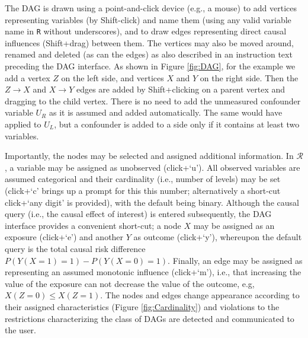 The DAG is drawn using a point-and-click device (e.g., a mouse) to add vertices representing variables (by Shift-click) and name them (using any valid variable name in \texttt{R} without underscores), and to draw edges representing direct causal influences (Shift+drag) between them. The vertices may also be moved around, renamed and deleted (as can the edges) as also described in an instruction text preceding the DAG interface. As shown in Figure \ref{fig:DAG}, for the example we add a vertex \(Z\) on the left side, and vertices \(X\) and \(Y\) on the right side. Then the \(Z \to X\) and \(X \to Y\) edges are added by Shift+clicking on a parent vertex and dragging to the child vertex. There is no need to add the unmeasured confounder variable \(U_R\) as it is assumed and added automatically. The same would have applied to \(U_L\), but a confounder is added to a side only if it contains at least two variables.

Importantly, the nodes may be selected and assigned additional information. In \(\mathcal{R}\), a variable may be assigned as unobserved (click+`u'). All observed variables are assumed categorical and their cardinality (i.e., number of levels) may be set (click+`c' brings up a prompt for this this number; alternatively a short-cut click+`any digit' is provided), with the default being binary. Although the causal query (i.e., the causal effect of interest) is entered subsequently, the DAG interface provides a convenient short-cut; a node \(X\) may be assigned as an exposure (click+`e') and another \(Y\) as outcome (click+`y'), whereupon the default query is the total causal risk difference \(P(Y(X=1)=1)-P(Y(X=0)=1)\). Finally, an edge may be assigned as representing an assumed monotonic influence (click+`m'), i.e., that increasing the value of the exposure can not decrease the value of the outcome, e.g, \(X(Z=0)\le X(Z=1)\). The nodes and edges change appearance according to their assigned characteristics (Figure \ref{fig:Cardinality}) and violations to the restrictions characterizing the class of DAGs are detected and communicated to the user.

